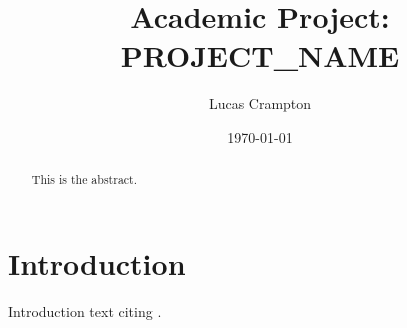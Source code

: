 \documentclass[12pt]{article}
\title{Academic Project: {{PROJECT_NAME}}}
\author{Lucas Crampton}
\date{\today}
\begin{document}
\maketitle

\begin{abstract}
This is the abstract.
\end{abstract}

\section{Introduction}
Introduction text citing \cite{example_ref}.



\end{document}
